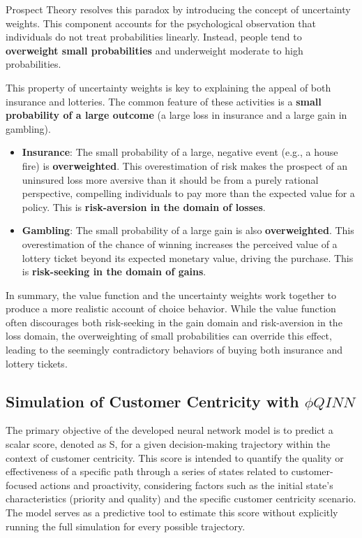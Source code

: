 \documentclass{article}
\begin{document}
Prospect Theory resolves this paradox by introducing the concept of uncertainty weights. This component accounts for the psychological observation that individuals do not treat probabilities linearly. Instead, people tend to \textbf{overweight small probabilities} and underweight moderate to high probabilities.

This property of uncertainty weights is key to explaining the appeal of both insurance and lotteries. The common feature of these activities is a \textbf{small probability of a large outcome} (a large loss in insurance and a large gain in gambling).

\begin{itemize}
\item \textbf{Insurance}: The small probability of a large, negative event (e.g., a house fire) is \textbf{overweighted}. This overestimation of risk makes the prospect of an uninsured loss more aversive than it should be from a purely rational perspective, compelling individuals to pay more than the expected value for a policy. This is \textbf{risk-aversion in the domain of losses}.

\item \textbf{Gambling}: The small probability of a large gain is also \textbf{overweighted}. This overestimation of the chance of winning increases the perceived value of a lottery ticket beyond its expected monetary value, driving the purchase. This is \textbf{risk-seeking in the domain of gains}.

\end{itemize}

In summary, the value function and the uncertainty weights work together to produce a more realistic account of choice behavior. While the value function often discourages both risk-seeking in the gain domain and risk-aversion in the loss domain, the overweighting of small probabilities can override this effect, leading to the seemingly contradictory behaviors of buying both insurance and lottery tickets.



\subsection{Simulation of Customer Centricity with $\phi QINN$}
The primary objective of the developed neural network model is to predict a scalar score, denoted as S, for a given decision-making trajectory within the context of customer centricity. This score is intended to quantify the quality or effectiveness of a specific path through a series of states related to customer-focused actions and proactivity, considering factors such as the initial state's characteristics (priority and quality) and the specific customer centricity scenario. The model serves as a predictive tool to estimate this score without explicitly running the full simulation for every possible trajectory.
\end{document}
